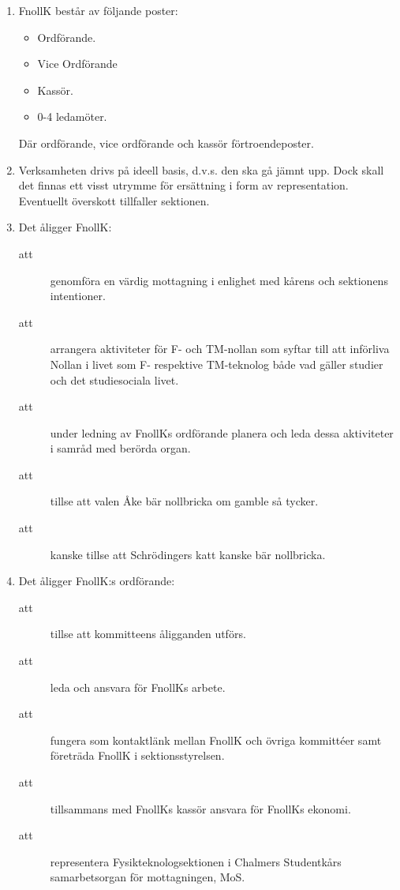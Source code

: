 \documentclass[11pt,a4paper]{article}
\begin{document}
\begin{enumerate}[\thesubsection .1]

  \item FnollK består av följande poster:
    \begin{itemize}
      \item Ordförande.
      \item Vice Ordförande
      \item Kassör.
      \item 0-4 ledamöter.
    \end{itemize}

  Där ordförande, vice ordförande och  kassör förtroendeposter.
  

  \item Verksamheten drivs på ideell basis, d.v.s. den ska gå jämnt
  upp. Dock skall det finnas ett visst utrymme för ersättning i form
  av representation. Eventuellt överskott tillfaller sektionen. 

  \item Det åligger FnollK:
    \begin{description}
      \item[att] genomföra en värdig mottagning i enlighet med kårens och sektionens intentioner.
      \item[att] arrangera aktiviteter för F- och TM-nollan som syftar till
      att införliva Nollan i livet som F- respektive TM-teknolog både vad gäller
      studier och det studiesociala livet.
      \item[att] under ledning av FnollKs  ordförande planera och leda dessa aktiviteter i samråd med berörda organ.
      \item[att] tillse att valen Åke bär nollbricka om gamble så
      tycker.
      \item[att] kanske tillse att Schrödingers katt kanske bär nollbricka.
    \end{description}

  \item Det åligger FnollK:s ordförande:
    \begin{description}
      \item[att] tillse att kommitteens åligganden utförs.
      \item[att] leda och ansvara för FnollKs arbete.
     
     
      \item[att] fungera som kontaktlänk mellan FnollK och övriga kommittéer samt företräda FnollK i sektionsstyrelsen.
      \item[att] tillsammans med FnollKs kassör ansvara för FnollKs ekonomi.
      \item[att] representera Fysikteknologsektionen i Chalmers Studentkårs samarbetsorgan för mottagningen, MoS.
    \end{description}


\end{enumerate}
\end{document}
